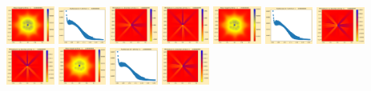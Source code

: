 \documentclass[11pt]{article}
\begin{document}
\vskip 10pt 
\includegraphics[width=0.11875\textwidth]{frame0038fig0.png}
\includegraphics[width=0.11875\textwidth]{frame0038fig1.png}
\includegraphics[width=0.11875\textwidth]{frame0038fig2.png}
\includegraphics[width=0.11875\textwidth]{frame0038fig3.png}
\includegraphics[width=0.11875\textwidth]{frame0039fig0.png}
\includegraphics[width=0.11875\textwidth]{frame0039fig1.png}
\includegraphics[width=0.11875\textwidth]{frame0039fig2.png}
\includegraphics[width=0.11875\textwidth]{frame0039fig3.png}
\vskip 10pt 
\includegraphics[width=0.11875\textwidth]{frame0040fig0.png}
\includegraphics[width=0.11875\textwidth]{frame0040fig1.png}
\includegraphics[width=0.11875\textwidth]{frame0040fig2.png}
\end{document}
